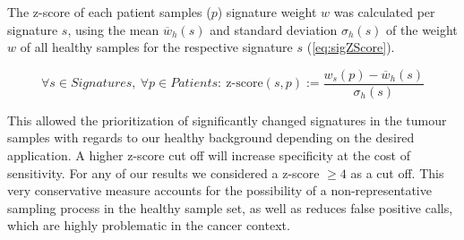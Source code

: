 The z-score of each patient samples ($p$) signature weight $w$ was calculated per signature $s$, using the mean $\overline{w}_h(s)$ and standard deviation $\sigma_h(s)$ of the weight $w$ of all healthy samples for the respective signature $s$ (\autoref{eq:sigZScore}).

\begin{equation}
\forall s \in Signatures,\ \forall p \in Patients:\ \text{z-score}(s,p) := \frac{w_s(p) - \overline{w}_h(s)}{\sigma_h(s)}
\label{eq:sigZScore}
\end{equation}
\myequation[\ref{eq:sigZScore}]{MisMatchFinder: z-score calculation per signature and patient}

This allowed the prioritization of significantly changed signatures in the tumour samples with regards to our healthy background depending on the desired application. A higher z-score cut off will increase specificity at the cost of sensitivity. For any of our results we considered a z-score $\geq 4$ as a cut off. This very conservative measure accounts for the possibility of a non-representative sampling process in the healthy sample set, as well as reduces false positive calls, which are highly problematic in the cancer context.

